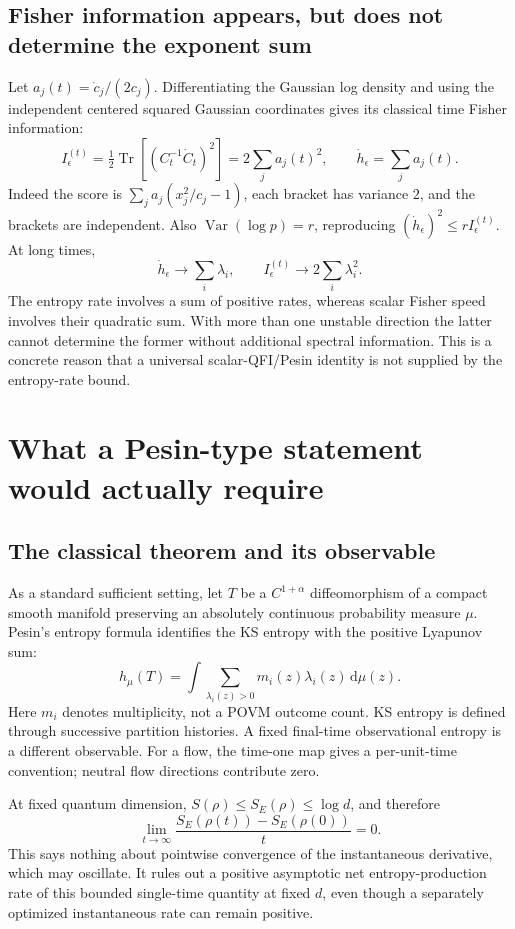 \documentclass[11pt,a4paper]{article}
\DeclareMathOperator{\Tr}{Tr}
\DeclareMathOperator{\Var}{Var}
\newcommand{\dd}{\mathrm{d}}
\begin{document}
\subsection{Fisher information appears, but does not determine the exponent sum}
Let $a_j(t)=\dot c_j/(2c_j)$. Differentiating the Gaussian log density and using the independent centered squared Gaussian coordinates gives its classical time Fisher information:
\[I_\epsilon^{(t)}=\tfrac12\Tr[(C_t^{-1}\dot C_t)^2]=2\sum_ja_j(t)^2,\qquad\dot h_\epsilon=\sum_ja_j(t).\]
Indeed the score is $\sum_ja_j(x_j^2/c_j-1)$, each bracket has variance $2$, and the brackets are independent. Also $\Var(\log p)=r$, reproducing $(\dot h_\epsilon)^2\le rI_\epsilon^{(t)}$. At long times,
\[\dot h_\epsilon\longrightarrow\sum_i\lambda_i,\qquad I_\epsilon^{(t)}\longrightarrow2\sum_i\lambda_i^2.\]
The entropy rate involves a sum of positive rates, whereas scalar Fisher speed involves their quadratic sum. With more than one unstable direction the latter cannot determine the former without additional spectral information. This is a concrete reason that a universal scalar-QFI/Pesin identity is not supplied by the entropy-rate bound.

\section{What a Pesin-type statement would actually require}
\subsection{The classical theorem and its observable}
As a standard sufficient setting, let $T$ be a $C^{1+\alpha}$ diffeomorphism of a compact smooth manifold preserving an absolutely continuous probability measure $\mu$. Pesin's entropy formula identifies the KS entropy with the positive Lyapunov sum:
\[h_\mu(T)=\int\sum_{\lambda_i(z)>0}m_i(z)\lambda_i(z)\,\dd\mu(z).\]
Here $m_i$ denotes multiplicity, not a POVM outcome count. KS entropy is defined through successive partition histories. A fixed final-time observational entropy is a different observable. For a flow, the time-one map gives a per-unit-time convention; neutral flow directions contribute zero.

At fixed quantum dimension, $S(\rho)\le S_E(\rho)\le\log d$, and therefore
\[\lim_{t\to\infty}\frac{S_E(\rho(t))-S_E(\rho(0))}{t}=0.\]
This says nothing about pointwise convergence of the instantaneous derivative, which may oscillate. It rules out a positive asymptotic net entropy-production rate of this bounded single-time quantity at fixed $d$, even though a separately optimized instantaneous rate can remain positive.
\end{document}
